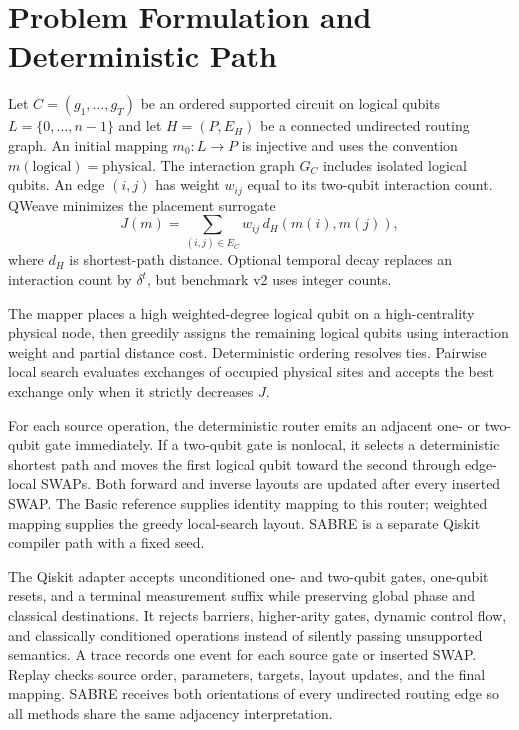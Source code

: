 \documentclass[conference]{IEEEtran}
\begin{document}
\section{Problem Formulation and Deterministic Path}
Let $C=(g_1,\ldots,g_T)$ be an ordered supported circuit on logical qubits
$L=\{0,\ldots,n-1\}$ and let $H=(P,E_H)$ be a connected undirected routing
graph. An initial mapping $m_0:L\rightarrow P$ is injective and uses the
convention $m(\mathrm{logical})=\mathrm{physical}$. The interaction graph
$G_C$ includes isolated logical qubits. An edge $(i,j)$ has weight $w_{ij}$
equal to its two-qubit interaction count. QWeave minimizes the placement
surrogate
{\large
\begin{equation}
 J(m)=\sum_{(i,j)\in E_C}w_{ij}\,d_H(m(i),m(j)),
 \label{eq:objective}
\end{equation}
}
where $d_H$ is shortest-path distance. Optional temporal decay replaces an
interaction count by $\delta^t$, but benchmark v2 uses integer counts.

The mapper places a high weighted-degree logical qubit on a high-centrality
physical node, then greedily assigns the remaining logical qubits using
interaction weight and partial distance cost. Deterministic ordering resolves
ties. Pairwise local search evaluates exchanges of occupied physical sites and
accepts the best exchange only when it strictly decreases $J$.

For each source operation, the deterministic router emits an adjacent
one- or two-qubit gate immediately. If a two-qubit gate is nonlocal, it selects
a deterministic shortest path and moves the first logical qubit toward the
second through edge-local SWAPs. Both forward and inverse layouts are updated
after every inserted SWAP. The Basic reference supplies identity mapping to
this router; weighted mapping supplies the greedy local-search layout. SABRE is
a separate Qiskit compiler path with a fixed seed.

The Qiskit adapter accepts unconditioned one- and two-qubit gates, one-qubit
resets, and a terminal measurement suffix while preserving global phase and
classical destinations. It rejects barriers, higher-arity gates, dynamic
control flow, and classically conditioned operations instead of silently
passing unsupported semantics. A trace records one event for each source gate
or inserted SWAP. Replay checks source order, parameters, targets, layout
updates, and the final mapping. SABRE receives both orientations of every
undirected routing edge so all methods share the same adjacency interpretation.
\end{document}
